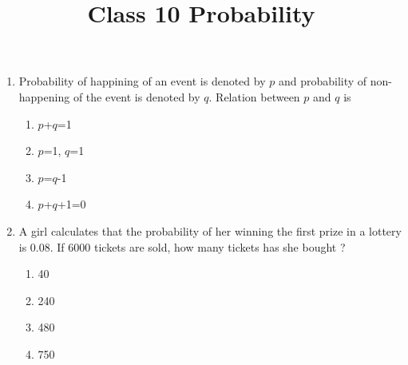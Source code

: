 \documentclass{article}
\begin{document}
\title{Class 10 Probability}
\maketitle
\LARGE
\begin{enumerate}
	\item Probability of happining of an event is denoted by $p$ and probability of non-happening of the event is denoted by $q$. Relation between $p$ and $q$ is 
			\begin{enumerate}
				\item $p$+$q$=1
				\item $p$=1, $q$=1
				\item $p$=$q$-1
				\item $p$+$q$+1=0
			\end{enumerate}
	\item A girl calculates that the probability of her winning the first prize in a lottery is 0.08. If 6000 tickets are sold, how many tickets has she bought ?
			\begin{enumerate}
				\item  40
				\item  240
				\item  480
				\item  750


\end{enumerate}
\end{enumerate}
\end{document}
